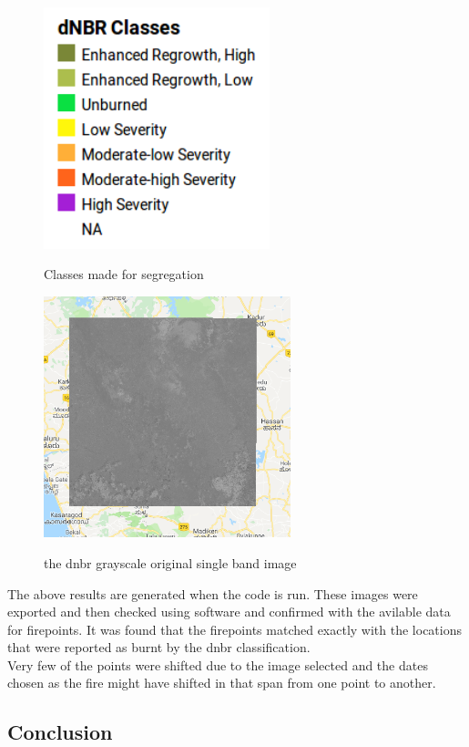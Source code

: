 \documentclass[12pt]{svproc}
\begin{document}
\begin{figure}{}
	\includegraphics[width=0.5\linewidth, height=7cm]{classes.png} 
	\label{fig:subim1}
	\centering
	\caption{Classes made for segregation}
\end{figure}

\begin{figure}{}
	\includegraphics[width=0.6\linewidth, height=7cm]{delta.png} 
	\label{fig:subim1}
	\centering
	\caption{the dnbr grayscale original single band image}
\end{figure}

The above results are generated when the code is run. These images were exported and then checked using software and confirmed with the avilable data for firepoints. It was found that the firepoints matched exactly with the locations that were reported as burnt by the dnbr classification.\\

Very few of the points were shifted due to the image selected and the dates chosen as the fire might have shifted in that span from one point to another.




\subsection{Conclusion}
\end{document}
